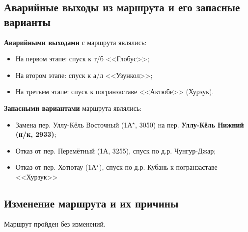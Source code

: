 \subsection{Аварийные выходы из маршрута и его запасные варианты}
\textbf{Аварийными выходами} с маршрута являлись:
\begin{itemize}
	\item На первом этапе: спуск к т/б <<Глобус>>;
	\item На втором этапе: спуск к а/л <<Узункол>>;
	\item На третьем этапе: спуск к погранзаставе <<Актюбе>> (Хурзук).
\end{itemize}
\textbf{Запасными вариантами} маршрута являлись:
\begin{itemize}
	\item Замена пер. Уллу-Кёль Восточный (1А$^\star$, 3050) на пер. \textbf{Уллу-Кёль Нижний (н/к, 2933)};
	\item Отказ от пер. Перемётный (1А, 3255), спуск по д.р. Чунгур-Джар;
	\item Отказ от пер. Хотютау (1А$^\star$), спуск по д.р. Кубань к погранзаставе <<Хурзук>>
\end{itemize}
\subsection{Изменение маршрута и их причины}
Маршрут пройден без изменений.
